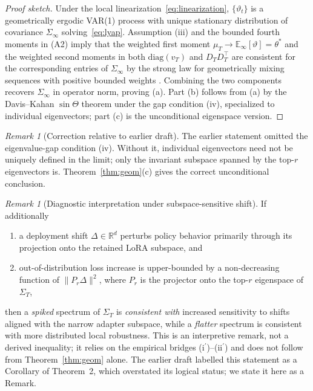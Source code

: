 \documentclass[10pt]{article}
\theoremstyle{plain}
\theoremstyle{definition}
\theoremstyle{remark}
\newtheorem{remark}[theorem]{Remark}
\newcommand{\E}{\mathbb{E}}
\newcommand{\diag}{\mathrm{diag}}
\begin{document}
\begin{proof}[Proof sketch]
Under the local linearization~\eqref{eq:linearization}, $\{\vartheta_t\}$ is a geometrically ergodic VAR(1) process with unique stationary distribution of covariance $\Sigma_\infty$ solving~\eqref{eq:lyap}. Assumption (iii) and the bounded fourth moments in (A2) imply that the weighted first moment $\mu_T\to\E_\infty[\vartheta]=\theta^\ast$ and the weighted second moments in both $\diag(v_T)$ and $D_T D_T^\top$ are consistent for the corresponding entries of $\Sigma_\infty$ by the strong law for geometrically mixing sequences with positive bounded weights \citep{maddox2019swag}. Combining the two components recovers $\Sigma_\infty$ in operator norm, proving (a). Part (b) follows from (a) by the Davis--Kahan $\sin\Theta$ theorem under the gap condition (iv), specialized to individual eigenvectors; part (c) is the unconditional eigenspace version.
\end{proof}

\begin{remark}[Correction relative to earlier draft]
The earlier statement omitted the eigenvalue-gap condition (iv). Without it, individual eigenvectors need not be uniquely defined in the limit; only the invariant subspace spanned by the top-$r$ eigenvectors is. Theorem~\ref{thm:geom}(c) gives the correct unconditional conclusion.
\end{remark}

\begin{remark}[Diagnostic interpretation under subspace-sensitive shift]\label{rem:diag}
If additionally
\begin{enumerate}[leftmargin=1.8em,itemsep=0.15em,label=\textup{(\roman*$^\prime$)}]
  \item a deployment shift $\Delta\in\mathbb{R}^d$ perturbs policy behavior primarily through its projection onto the retained LoRA subspace, and
  \item out-of-distribution loss increase is upper-bounded by a non-decreasing function of $\|P_r\Delta\|^2$, where $P_r$ is the projector onto the top-$r$ eigenspace of $\Sigma_T$,
\end{enumerate}
then a \emph{spiked} spectrum of $\Sigma_T$ is \emph{consistent with} increased sensitivity to shifts aligned with the narrow adapter subspace, while a \emph{flatter} spectrum is consistent with more distributed local robustness. This is an interpretive remark, not a derived inequality; it relies on the empirical bridges (i$^\prime$)--(ii$^\prime$) and does not follow from Theorem~\ref{thm:geom} alone. The earlier draft labelled this statement as a Corollary of Theorem~2, which overstated its logical status; we state it here as a Remark.
\end{remark}
\end{document}
